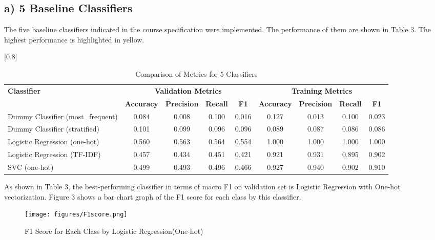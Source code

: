 \documentclass[a4paper,11pt]{article}
\begin{document}
\subsection{a) 5 Baseline Classifiers}
The five baseline classifiers indicated in the course specification were implemented.
The performance of them are shown in Table 3.
The highest performance is highlighted in yellow.

\begin{table}[htbp]
    \centering
    \caption{Comparison of Metrics for 5 Classifiers}
    \label{tab:classifier_metrics}
    \small
    \scalebox{0.8}[0.8]{
    \begin{tabular}{l|cccc|cccc}
        \hline
        \textbf{Classifier} & \multicolumn{4}{c|}{\textbf{Validation Metrics}} & \multicolumn{4}{c}{\textbf{Training Metrics}} \\
        & \textbf{Accuracy} & \textbf{Precision} & \textbf{Recall} & \textbf{F1} & \textbf{Accuracy} & \textbf{Precision} & \textbf{Recall} & \textbf{F1} \\
        \hline
        Dummy Classifier (most\_frequent) & {0.084} & 0.008 & 0.100 & 0.016 & 0.127 & 0.013 & 0.100 & 0.023 \\
        Dummy Classifier (stratified) & 0.101 & 0.099 & 0.096 & 0.096 & 0.089 & 0.087 & 0.086 & 0.086 \\
        \rowcolor[rgb]{0.9,0.9,0}Logistic Regression (one-hot) & \colorbox[rgb]{0.9, 0.9, 0}{0.560} & \colorbox[rgb]{0.9, 0.9, 0}{0.563} & \colorbox[rgb]{0.9, 0.9, 0}{0.564} & \colorbox[rgb]{0.9, 0.9, 0}{0.554} & 1.000 & 1.000 & 1.000 & 1.000 \\
        Logistic Regression (TF-IDF) & 0.457 & 0.434 & 0.451 & 0.421 & 0.921 & 0.931 & 0.895 & 0.902 \\
        SVC (one-hot) & 0.499 & 0.493 & 0.496 & 0.466 & 0.927 & 0.940 & 0.902 & 0.910 \\
        \hline
    \end{tabular}
    }
\end{table}

As shown in Table 3, the best-performing classifier in terms of macro F1 on validation set is Logistic Regression with One-hot vectorization.
Figure 3 shows a bar chart graph of the F1 score for each class by this classifier.

\begin{figure}[htbp]
  \begin{center}
  \texttt{[image: figures/F1score.png]}
  \caption{F1 Score for Each Class by Logistic Regression(One-hot)}
  \end{center}
\end{figure}
\end{document}
